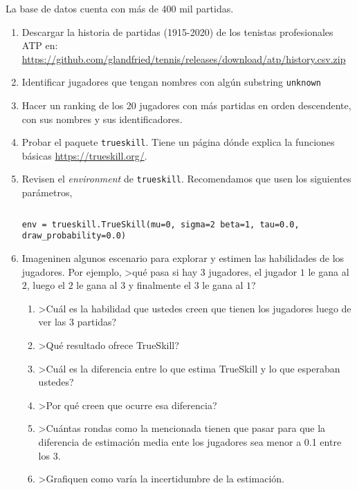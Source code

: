 \documentclass[a4paper,10pt]{article}
\begin{document}
La base de datos cuenta con más de 400 mil partidas.

\begin{enumerate}
 \item Descargar la historia de partidas (1915-2020) de los tenistas profesionales ATP en: \url{https://github.com/glandfried/tennis/releases/download/atp/history.csv.zip}
 \item Identificar jugadores que tengan nombres con algún substring \texttt{unknown}
 \item Hacer un ranking de los 20 jugadores con más partidas en orden descendente, con sus nombres y sus identificadores.
 \item Probar el paquete \texttt{trueskill}. Tiene un página dónde explica la funciones básicas \url{https://trueskill.org/}.
 \item Revisen el \emph{environment} de \texttt{trueskill}.
    Recomendamos que usen los siguientes parámetros,

    \begin{lstlisting}[backgroundcolor=\color{white},label=lst:env, caption=\relax, belowskip=-1.0 \baselineskip, aboveskip=-0 \baselineskip]
    \end{lstlisting}
    \begin{lstlisting}[backgroundcolor=\color{all}]
    env = trueskill.TrueSkill(mu=0, sigma=2 beta=1, tau=0.0, draw_probability=0.0)
    \end{lstlisting}  
 \item Imageninen algunos escenario para explorar y estimen las habilidades de los jugadores. Por ejemplo, >qué pasa si hay 3 jugadores, el jugador $1$ le gana al $2$, luego el $2$ le gana al $3$ y finalmente el $3$ le gana al $1$?
    \begin{enumerate}
    \item >Cuál es la habilidad que ustedes creen que tienen los jugadores luego de ver las 3 partidas?
    \item >Qué resultado ofrece TrueSkill?
    \item >Cuál es la diferencia entre lo que estima TrueSkill y lo que esperaban ustedes?
    \item >Por qué creen que ocurre esa diferencia?
    \item >Cuántas rondas como la mencionada tienen que pasar para que la diferencia de estimación media ente los jugadores sea menor a 0.1 entre los 3.
    \item >Grafiquen como varía la incertidumbre de la estimación.
    \end{enumerate}
\end{enumerate}
\end{document}
